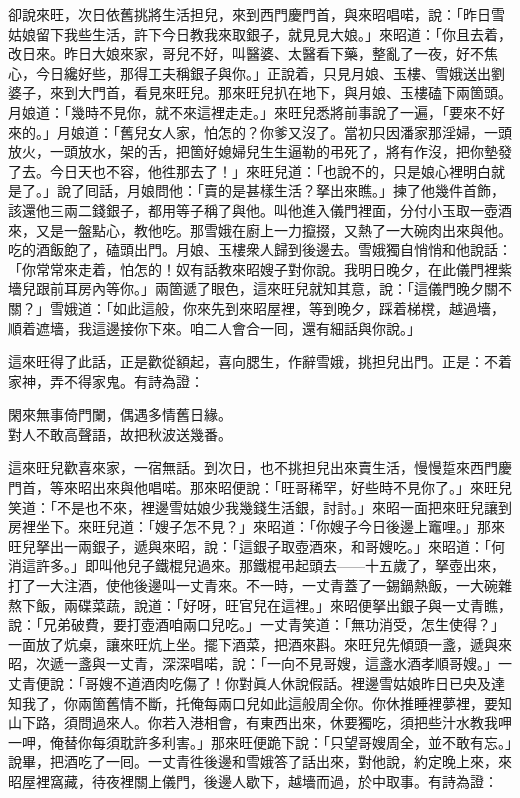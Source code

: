 卻說來旺，次日依舊挑將生活担兒，來到西門慶門首，與來昭唱喏，說：「昨日雪姑娘留下我些生活，許下今日教我來取銀子，就見見大娘。」來昭道：「你且去着，改日來。昨日大娘來家，哥兒不好，叫醫婆、太醫看下藥，整亂了一夜，好不焦心，今日纔好些，那得工夫稱銀子與你。」正說着，只見月娘、玉樓、雪娥送出劉婆子，來到大門首，看見來旺兒。那來旺兒扒在地下，與月娘、玉樓磕下兩箇頭。月娘道：「幾時不見你，就不來這裡走走。」來旺兒悉將前事說了一遍，「要來不好來的。」月娘道：「舊兒女人家，怕怎的？你爹又沒了。當初只因潘家那淫婦，一頭放火，一頭放水，架的舌，把箇好媳婦兒生生逼勒的弔死了，將有作沒，把你墊發了去。今日天也不容，他徃那去了！」{}來旺兒道：「也說不的，只是娘心裡明白就是了。」說了囘話，月娘問他：「賣的是甚樣生活？拏出來瞧。」揀了他幾件首飾，該還他三兩二錢銀子，都用等子稱了與他。叫他進入儀門裡面，{}分付小玉取一壺酒來，又是一盤點心，教他吃。那雪娥在廚上一力攛掇，又熱了一大碗肉出來與他。吃的酒飯飽了，磕頭出門。月娘、玉樓衆人歸到後邊去。{}雪娥獨自悄悄和他說話：「你常常來走着，怕怎的！奴有話教來昭嫂子對你說。我明日晚夕，在此儀門裡紫墻兒跟前耳房內等你。」兩箇遞了眼色，這來旺兒就知其意，說：「這儀門晚夕關不關？」雪娥道：「如此這般，你來先到來昭屋裡，等到晚夕，踩着梯櫈，越過墻，順着遮墻，我這邊接你下來。咱二人會合一囘，還有細話與你說。」

這來旺得了此話，正是歡從額起，喜向腮生，作辭雪娥，挑担兒出門。正是：不着家神，弄不得家鬼。有詩為證：

\begin{myquote}
閑來無事倚門闌，偶遇多情舊日緣。\\對人不敢高聲語，故把秋波送幾番。
\end{myquote}

這來旺兒歡喜來家，一宿無話。到次日，也不挑担兒出來賣生活，慢慢踅來西門慶門首，等來昭出來與他唱喏。那來昭便說：「旺哥稀罕，好些時不見你了。」來旺兒笑道：「不是也不來，裡邊雪姑娘少我幾錢生活銀，討討。」來昭一面把來旺兒讓到房裡坐下。來旺兒道：「嫂子怎不見？」來昭道：「你嫂子今日後邊上竈哩。」那來旺兒拏出一兩銀子，遞與來昭，{}說：「這銀子取壺酒來，和哥嫂吃。」來昭道：「何消這許多。」即叫他兒子鐵棍兒過來。那鐵棍弔起頭去——十五歲了，拏壺出來，打了一大注酒，使他後邊叫一丈青來。不一時，一丈青蓋了一錫鍋熱飯，一大碗雜熬下飯，兩碟菜蔬，說道：「好呀，旺官兒在這裡。」來昭便拏出銀子與一丈青瞧，說：「兄弟破費，要打壺酒咱兩口兒吃。」一丈青笑道：「無功消受，怎生使得？」一面放了炕桌，讓來旺炕上坐。擺下酒菜，把酒來斟。來旺兒先傾頭一盞，遞與來昭，次遞一盞與一丈青，深深唱喏，說：「一向不見哥嫂，這盞水酒孝順哥嫂。」一丈青便說：「哥嫂不道酒肉吃傷了！你對眞人休說假話。裡邊雪姑娘昨日已央及達知我了，你兩箇舊情不斷，托俺每兩口兒如此這般周全你。你休推睡裡夢裡，要知山下路，須問過來人。你若入港相會，有東西出來，休要獨吃，須把些汁水教我呷一呷，俺替你每須耽許多利害。」那來旺便跪下說：「只望哥嫂周全，並不敢有忘。」說畢，把酒吃了一囘。一丈青徃後邊和雪娥答了話出來，對他說，約定晚上來，來昭屋裡窩藏，待夜裡關上儀門，後邊人歇下，越墻而過，於中取事。有詩為證：

